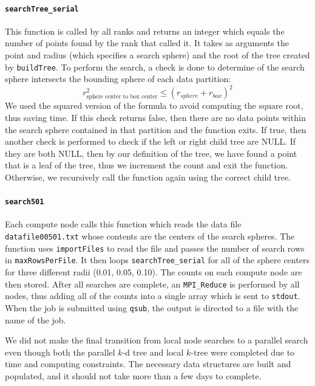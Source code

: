 \documentclass{article}
\begin{document}
\paragraph{\texttt{searchTree\_serial}}
This function is called by all ranks and returns an integer which equals the number of points found by the rank that called it. It takes as arguments the point and radius (which specifies a search sphere) and the root of the tree created by \texttt{buildTree}. To perform the search, a check is done to determine of the search sphere intersects the bounding sphere of each data partition:
\begin{equation}
		r^2_\textrm{sphere center to box center} \le (r_{sphere} + r_{box})^2
\end{equation}
We used the squared version of the formula to avoid computing the square root, thus saving time. If this check returns false, then there are no data points within the search sphere contained in that partition and the function exits. If true, then another check is performed to check if the left or right child tree are NULL. If they are both NULL, then by our definition of the tree, we have found a point that is a leaf of the tree, thus we increment the count and exit the function. Otherwise, we recursively call the function again using the correct child tree.

%
%

\paragraph{\texttt{search501}}
%
%

Each compute node calls this function which reads the data file \\
\texttt{datafile00501.txt} whose contents are the centers of the search spheres. The function uses \texttt{importFiles} to read the file and passes the number of search rows in \texttt{maxRowsPerFile}. It then loops \texttt{searchTree\_serial} for all of the sphere centers for three different radii (0.01, 0.05, 0.10). The counts on each compute node are then stored. After all searches are complete, an \texttt{MPI\_Reduce} is performed by all nodes, thus adding all of the counts into a single array which is sent to \texttt{stdout}. When the job is submitted using \texttt{qsub}, the output is directed to a file with the name of the job.

We did not make the final transition from local node searches to a parallel search even though both the parallel $k$-d tree and local $k$-tree were completed due to time and computing constraints. The necessary data structures are built and populated, and it should not take more than a few days to complete.
\end{document}
